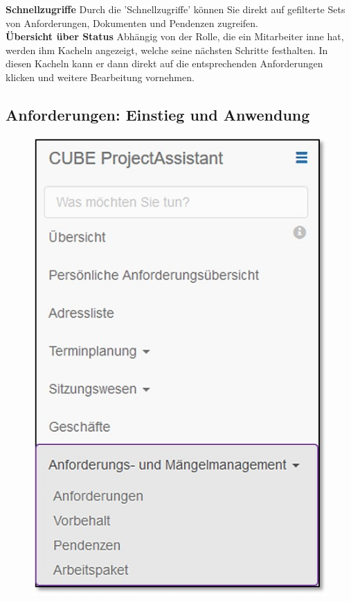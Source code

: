 \textbf{Schnellzugriffe}
Durch die 'Schnellzugriffe' können Sie direkt auf gefilterte Sets von Anforderungen, Dokumenten und Pendenzen zugreifen. \\

\textbf{Übersicht über Status}
Abhängig von der Rolle, die ein Mitarbeiter inne hat, werden ihm Kacheln angezeigt, welche seine nächsten Schritte festhalten. In diesen Kacheln kann er dann direkt auf die entsprechenden Anforderungen klicken und weitere Bearbeitung vornehmen.

\pagebreak

\subsection{Anforderungen: Einstieg und Anwendung}

\begin{figure}   %
  \vspace{-30pt}      %
  \begin{center}
    \includegraphics[width=1\linewidth]{../chapters/06_Anf-Maengelmanagement/pictures/amm_Menue.jpg}

\end{center}
\end{figure}
